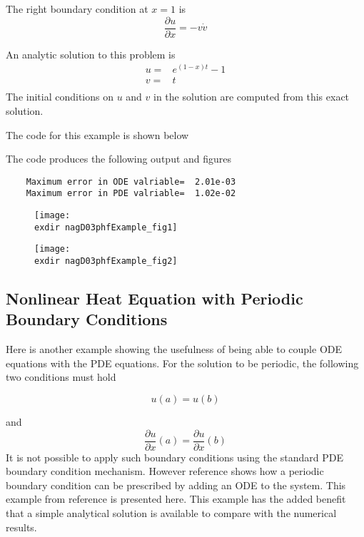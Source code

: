\documentclass{article}
\begin{document}
The right boundary condition at $x = 1$ is
\begin{equation}
	\frac{\partial u}{\partial x}=-v\dot v
\end{equation}

An analytic solution to this problem is
\begin{eqnarray}
	u =& e^{(1-x)t} - 1 \\
		v=&t \\
\end{eqnarray}
The initial conditions on $u$ and $v$ in the \pde solution are computed
from this exact solution.

The code for this example is shown below

The code produces the following output and figures

\begin{lstlisting}
	Maximum error in ODE valriable=  2.01e-03
	Maximum error in PDE valriable=  1.02e-02
\end{lstlisting}

\begin{figure}[ht]
	\centering
	\texttt{[image: \\exdir nagD03phfExample\_fig1]}
	\label{fig:nagD03phfExample_fig1}
\end{figure}

\begin{figure}[!ht]
	\centering
	\texttt{[image: \\exdir nagD03phfExample\_fig2]}
	\label{fig:nagD03phfExample_fig2}
\end{figure}

\newpage
\subsection{Nonlinear Heat Equation with Periodic Boundary Conditions}
Here is another example showing the usefulness of being able to couple
ODE equations with the PDE equations.
For the solution to be periodic, the following two conditions must
hold

\begin{equation}\label{eq_periodic_sol}
 u(a)=u(b) 
\end{equation}
 
 and 
\begin{equation}\label{eq_periodic_dsol}
 \frac{\partial u}{\partial x}(a)=\frac{\partial u}{\partial x}(b)
\end{equation}
It is not possible
to apply such boundary conditions using the standard PDE boundary condition
mechanism. However reference \cite{post} shows how a periodic boundary
condition can be prescribed by adding an ODE to the system. This example
from reference \cite{post} is presented here. This example has the added
benefit that a simple analytical solution is available to compare with
the numerical results. 
\end{document}

